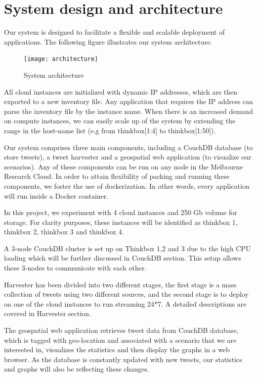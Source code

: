 \section{System design and architecture}
Our system is designed to facilitate a flexible and scalable deployment of applications. The following figure illustrates our system architecture.  

\begin{figure}[h]
\centering
\texttt{[image: architecture]}
\caption{System architecture}
\end{figure}

All cloud instances are initialized with dynamic IP addresses, which are then exported to a new inventory file. Any application that requires the IP address can parse the inventory file by the instance name. When there is an increased demand on compute instances, we can easily scale up of the system by extending the range in the host-name list (e.g from thinkbox[1:4] to thinkbox[1:50]).  

Our system comprises three main components, including a CouchDB database (to store tweets), a tweet harvester and a geospatial web application (to visualize our scenarios). Any of these components can be run on any node in the Melbourne Research Cloud. In order to attain flexibility of packing and running these components, we foster the use of dockerization. In other words, every application will run inside a Docker container.  

In this project, we experiment with 4 cloud instances and 250 Gb volume for storage. For clarity purposes, these instances will be identified as thinkbox 1, thinkbox 2, thinkbox 3 and thinkbox 4.  

A 3-node CouchDB cluster is set up on Thinkbox 1,2 and 3 due to the high CPU loading which will be further discussed in CouchDB section. This setup allows these 3-nodes to communicate with each other.

Harvester has been divided into two different stages, the first stage is a mass collection of tweets using two different sources, and the second stage is to deploy on one of the cloud instances to run streaming 24*7. A detailed descriptions are covered in Harvester section.

The geospatial web application retrieves tweet data from CouchDB database, which is tagged with geo-location and associated with a scenario that we are interested in, visualizes the statistics and then display the graphs in a web browser. As the database is constantly updated with new tweets, our statistics and graphs will also be reflecting these changes.  

